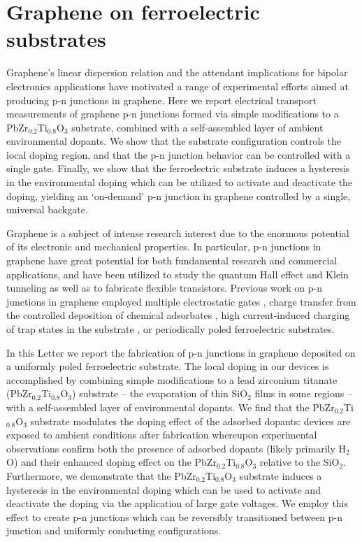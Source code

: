 \documentclass[edeposit,fullpage,draftthesis]{uiucthesis2009}
\begin{document}
\section{Graphene on ferroelectric substrates}


Graphene's linear dispersion relation and the attendant implications for bipolar electronics applications have motivated a range of experimental efforts aimed at producing p-n junctions in graphene. Here we report electrical transport measurements of graphene p-n junctions formed via simple modifications to a PbZr$_{0.2}$Ti$_{0.8}$O$_3$ substrate, combined with a self-assembled layer of ambient environmental dopants. We show that the substrate configuration controls the local doping region, and that the p-n junction behavior can be controlled with a single gate. Finally, we show that the ferroelectric substrate induces a hysteresis in the environmental doping which can be utilized to activate and deactivate the doping, yielding an `on-demand' p-n junction in graphene controlled by a single, universal backgate.


Graphene is a subject of intense research interest due to the enormous potential of its electronic and mechanical properties\cite{Geim2007}. In particular, p-n junctions in graphene have great potential for both fundamental research and commercial applications, and have been utilized to study the quantum Hall effect \cite{Williams2007, Ozyilmaz2007, Velasco2010} and Klein tunneling\cite{Stander2009, Young2009} as well as to fabricate flexible transistors\cite{Kim2010}. Previous work on p-n junctions in graphene employed multiple electrostatic gates \cite{Meric2008, Williams2007, Ozyilmaz2007, Huard2007, Liu2008, Stander2009, Velasco2009, Velasco2010, Young2009}, charge transfer from the controlled deposition of chemical adsorbates \cite{Farmer2009,Lohmann2009,Brenner2010,Cheng2011,Sojoudi2012,Seo2014,Park2015}, high current-induced charging of trap states in the substrate \cite{Chiu2010}, or periodically poled ferroelectric substrates\cite{Baeumer2015}.

In this Letter we report the fabrication of p-n junctions in graphene deposited on a uniformly poled ferroelectric substrate. The local doping in our devices is accomplished by combining simple modifications to a lead zirconium titanate (PbZr$_{0.2}$Ti$_{0.8}$O$_3$) substrate -- the evaporation of thin SiO$_2$ films in some regions -- with a self-assembled layer of environmental dopants. We find that the PbZr$_{0.2}$Ti$_{0.8}$O$_3$ substrate modulates the doping effect of the adsorbed dopants: devices are exposed to ambient conditions after fabrication whereupon experimental observations confirm both the presence of adsorbed dopants (likely primarily H$_2$O) and their enhanced doping effect on the PbZr$_{0.2}$Ti$_{0.8}$O$_3$ relative to the SiO$_2$.
Furthermore, we demonstrate that the PbZr$_{0.2}$Ti$_{0.8}$O$_3$ substrate induces a hysteresis in the environmental doping which can be used to activate and deactivate the doping via the application of large gate voltages. We employ this effect to create p-n junctions which can be reversibly transitioned between p-n junction and uniformly conducting configurations.
\end{document}
